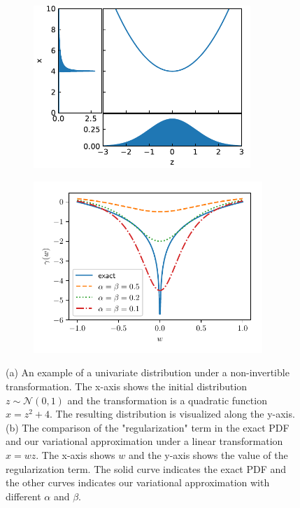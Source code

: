 \documentclass{article}
\begin{document}
\begin{figure}
     \begin{subfigure}[t]{0.45\textwidth}
         \centering
         \includegraphics[width=0.9\textwidth]{non-invertible_1d.pdf} 
         \caption{}
         \label{fig:nfw_1d_example}
     \end{subfigure}
     \begin{subfigure}[t]{0.45\textwidth}
         \centering
         \includegraphics[width=0.95\textwidth]{regulerizer.pdf} 
         \caption{}
         \label{fig:regularization}
     \end{subfigure}
\caption{(a) An example of a univariate distribution under a non-invertible transformation. The x-axis shows the initial distribution $z \sim \mathcal{N}(0, 1)$ and the transformation is a quadratic function $x=z^2+4$. The resulting distribution is visualized along the y-axis. (b) The comparison of the "regularization" term in the exact PDF and our variational approximation under a linear transformation $x=wz$. The x-axis shows $w$ and the y-axis shows the value of the regularization term.  The solid curve indicates the exact PDF and the other curves indicates our variational approximation with different $\alpha$ and $\beta$.} 
\end{figure}
\end{document}
